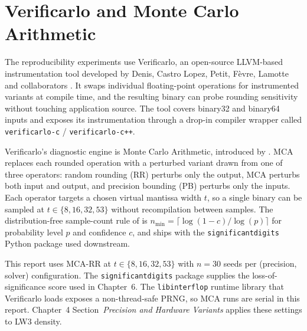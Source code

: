 \section{Verificarlo and Monte Carlo Arithmetic}
The reproducibility experiments use Verificarlo, an open-source LLVM-based instrumentation tool developed by Denis, Castro Lopez, Petit, F\`evre, Lamotte and collaborators \citep{denis_etal_2016}. It swaps individual floating-point operations for instrumented variants at compile time, and the resulting binary can probe rounding sensitivity without touching application source. The tool covers binary32 and binary64 inputs and exposes its instrumentation through a drop-in compiler wrapper called \texttt{verificarlo-c} / \texttt{verificarlo-c++}.

Verificarlo's diagnostic engine is Monte Carlo Arithmetic, introduced by \citet{parker_1997}. MCA replaces each rounded operation with a perturbed variant drawn from one of three operators: random rounding (RR) perturbs only the output, MCA perturbs both input and output, and precision bounding (PB) perturbs only the inputs. Each operator targets a chosen virtual mantissa width $t$, so a single binary can be sampled at $t \in \{8, 16, 32, 53\}$ without recompilation between samples. The distribution-free sample-count rule of \citet{sohier_etal_2021} is $n_{\min} = \lceil \log(1-c)/\log(p)\rceil$ for probability level $p$ and confidence $c$, and ships with the \texttt{significantdigits} Python package used downstream.

This report uses MCA-RR at $t \in \{8, 16, 32, 53\}$ with $n=30$ seeds per (precision, solver) configuration. The \texttt{significantdigits} package supplies the loss-of-significance score used in Chapter~6. The \texttt{libinterflop} runtime library that Verificarlo loads exposes a non-thread-safe PRNG, so MCA runs are serial in this report. Chapter~4 Section~\emph{Precision and Hardware Variants} applies these settings to LW3 density.
